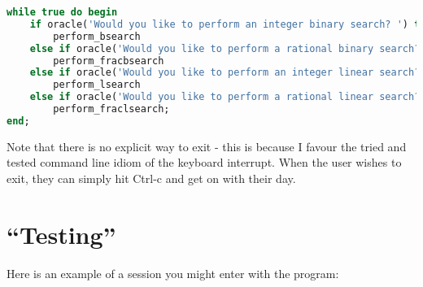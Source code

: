 \documentclass[fleqn,a4paper,11pt]{article}
\begin{document}
\begin{lstlisting}[language=Pascal, caption=Main interface loop]
while true do begin
    if oracle('Would you like to perform an integer binary search? ') then
        perform_bsearch
    else if oracle('Would you like to perform a rational binary search? ') then
        perform_fracbsearch
    else if oracle('Would you like to perform an integer linear search? ') then
        perform_lsearch
    else if oracle('Would you like to perform a rational linear search? ') then
        perform_fraclsearch;
end;
\end{lstlisting}

    Note that there is no explicit way to exit - this is because I favour the
    tried and tested command line idiom of the keyboard interrupt. When the user
    wishes to exit, they can simply hit Ctrl-c and get on with their day.

    \section{``Testing''}

    Here is an example of a session you might enter with the program:
\end{document}

